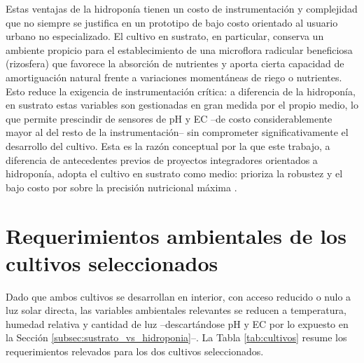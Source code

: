 Estas ventajas de la hidroponía tienen un costo de instrumentación y complejidad que no siempre se justifica en un prototipo de bajo costo orientado al usuario urbano no especializado. El cultivo en sustrato, en particular, conserva un ambiente propicio para el establecimiento de una microflora radicular beneficiosa (rizosfera) que favorece la absorción de nutrientes y aporta cierta capacidad de amortiguación natural frente a variaciones momentáneas de riego o nutrientes. Esto reduce la exigencia de instrumentación crítica: a diferencia de la hidroponía, en sustrato estas variables son gestionadas en gran medida por el propio medio, lo que permite prescindir de sensores de pH y EC --de costo considerablemente mayor al del resto de la instrumentación-- sin comprometer significativamente el desarrollo del cultivo. Esta es la razón conceptual por la que este trabajo, a diferencia de antecedentes previos de proyectos integradores orientados a hidroponía, adopta el cultivo en sustrato como medio: prioriza la robustez y el bajo costo por sobre la precisión nutricional máxima \cite{migliore2024, irazuzta2023}.

\section{Requerimientos ambientales de los cultivos seleccionados}
\label{subsec:requerimientos_cultivos}

Dado que ambos cultivos se desarrollan en interior, con acceso reducido o nulo a luz solar directa, las variables ambientales relevantes se reducen a temperatura, humedad relativa y cantidad de luz --descartándose pH y EC por lo expuesto en la Sección \ref{subsec:sustrato_vs_hidroponia}--. La Tabla \ref{tab:cultivos} resume los requerimientos relevados para los dos cultivos seleccionados.

